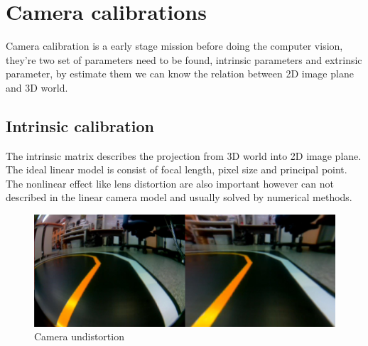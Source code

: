 \documentclass{article}
\begin{document}
\section{Camera calibrations}

Camera calibration is a early stage mission before doing the computer vision, they're two set of parameters need to be found, intrinsic parameters and extrinsic parameter, by estimate them we can know the relation between 2D image plane and 3D world. 

\subsection{Intrinsic calibration}

The intrinsic matrix describes the projection from 3D world into 2D image plane. The ideal linear model is consist of focal length, pixel size and principal point. The nonlinear effect like lens distortion are also important however can not described in the linear camera model and usually solved by numerical methods.

\begin{figure}[ht]
  \label{fig:distortion}
  \centering
  \includegraphics[scale=0.3]{graphs/distortion.png}
  \caption{Camera undistortion}
\end{figure}
\FloatBarrier
\end{document}
